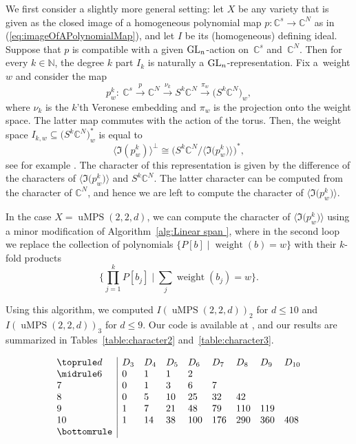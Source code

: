 \documentclass[10pt,a4paper]{amsart}
\numberwithin{equation}{section}
\newcommand{\CC}{\mathbb{C}}
\DeclareMathOperator{\uMPS}{uMPS}
\begin{document}
We first consider a slightly more general setting:
let $X$ be any variety that is given as the closed image of a homogeneous polynomial map $p\colon \CC^s \to \CC^N$ as in (\ref{eq:imageOfAPolynomialMap}), and let $I$ be its (homogeneous) defining ideal. Suppose that $p$ is compatible with a given ${\rm GL}_n$-action on~$\CC^s$ and~$\CC^N$. Then for every $k \in {\mathbb N}$, the degree $k$ part $I_k$ is naturally a ${\rm GL}_n$-representation. Fix a~weight $w$ and consider the map
\[
p^k_w\colon \  \CC^s \xrightarrow{p} \CC^N \xrightarrow{\nu_k} S^k\CC^N \xrightarrow{\pi_w} \big(S^k\CC^N\big)_w,
\]
where $\nu_k$ is the $k$'th Veronese embedding and $\pi_w$ is the projection onto the weight space. The latter map commutes with the action of the torus.
Then, the weight space $I_{k,w} \subseteq \big(S^k\CC^N\big)_w^*$ is equal to
\[ \big\langle \Im(p^k_w) \big\rangle^\perp \cong \big({S^k \CC^N} / {\big\langle \Im\big( p^k_w\big) \big\rangle} \big)^*,\]
see for example  \cite[Proposition~4.4.1.1]{landsberg2012tensors}.
The character of this representation is given by the difference of the characters of $\big\langle \Im\big(p^k_w\big) \big\rangle$ and $S^k \CC^N$. The latter character can be computed from the character of $\CC^N$, and hence we are left to compute the character of $\big\langle \Im\big(p^k_w\big) \big\rangle$.

In the case $X=\uMPS(2,2,d)$, we can compute the character of $\big\langle \Im\big(p^k_w\big) \big\rangle$ using a minor modification of Algorithm~\ref{alg:Linear span }, where in the second loop we replace the collection of polynomials
$\{P[b] \mid \operatorname{weight}(b) = w \}$
with their $k$-fold products
\[ \bigg\{\prod_{j=1}^{k} P[b_j] \mid \sum_j \operatorname{weight}(b_j) = w \bigg\}.\]

Using this algorithm, we computed $I(\uMPS(2,2,d))_2$ for $d\leq 10$ and $I(\uMPS(2,2,d))_3$ for $d\leq 9$. Our code is available at \cite{code}, and our results are summarized in Tables~\ref{table:character2} and~\ref{table:character3}.

 \begin{table}[th!]\centering
	\caption{Character of $I(\uMPS(2,2,d))^*_2$. Since $D_{w}=D_{2d-w}$ (again: for every ${\rm GL}_2$-representation $V$ we have that $V_{(b_0,b_1)}=V_{(b_1,b_0)}$),  we only list $D_w$ for $w \leq d$.}  \label{table:character2}

\vspace{-5mm}

$$
	\begin{array}{l|llllllll}
	\toprule
	d & D_3 	& D_4 & D_5 & D_6 & D_7 & D_8 & D_9 & D_{10}\\
	\midrule
	6 & 0   & 1  & 1  & 2   &     &     &     &     \\
	7 & 0   & 1  & 3  & 6   & 7   &     &     &     \\
	8 & 0   & 5  & 10 & 25  & 32  & 42  &     &     \\
	9 &  1  & 7  & 21 &  48 & 79  & 110 & 119 &     \\
	10 &  1 & 14 & 38 & 100 & 176 & 290 & 360 & 408 \\
	\bottomrule
	\end{array}$$
\vspace{-2mm}
\end{table}
\end{document}
